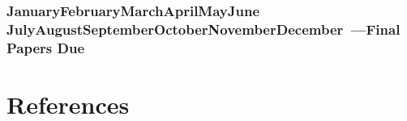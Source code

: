 \documentclass[10pt]{article}
\def\themonth{\ifcase\month\or
  January\or February\or March\or April\or May\or June\or
  July\or August\or September\or October\or November\or December\fi}
\begin{document}

\SetDate[16/05/2014]
\section{\themonth~\the\day---Final Papers Due}

\part{References}


  
\end{document}
